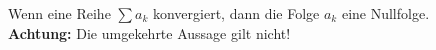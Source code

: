 Wenn eine Reihe $\sum a_k$ konvergiert, dann die Folge $a_k$ eine Nullfolge.
\\
\textbf{Achtung:} Die umgekehrte Aussage gilt nicht!
